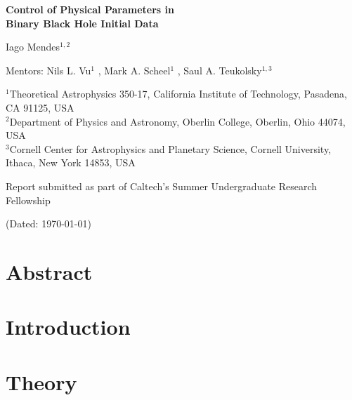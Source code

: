 \documentclass{../document}
\newcommand{\Caltech}{Theoretical Astrophysics 350-17, California Institute of Technology, Pasadena, CA 91125, USA}
\newcommand{\CaltechId}{1}
\newcommand{\Oberlin}{Department of Physics and Astronomy, Oberlin College, Oberlin, Ohio 44074, USA}
\newcommand{\OberlinId}{2}
\newcommand{\Cornell}{Cornell Center for Astrophysics and Planetary Science, Cornell University, Ithaca, New York 14853, USA}
\newcommand{\CornellId}{3}
\begin{document}
  \thispagestyle{plain}

  \vspace*{0.5cm}

  \begin{center}
    \Large\bf
    Control of Physical Parameters in \\
    Binary Black Hole Initial Data
  \end{center}
    
  \begin{center}
    Iago Mendes$^{\CaltechId,\OberlinId}$
  \end{center}

  \begin{flushleft}
    Mentors:
      Nils L. Vu$^\CaltechId$
        ,
      Mark A. Scheel$^\CaltechId$
        ,
      Saul A. Teukolsky$^{\CaltechId,\CornellId}$
  \end{flushleft}
   
  \begin{flushleft}
    \footnotesize
    $^\CaltechId$\Caltech \\
    $^\OberlinId$\Oberlin \\
    $^\CornellId$\Cornell
  \end{flushleft}

  \begin{flushleft}
    Report submitted as part of Caltech's Summer Undergraduate Research Fellowship
  \end{flushleft}

  \begin{center}
    (Dated: \today)
  \end{center}
  
  \vspace*{0.5cm}

  \section*{Abstract}

  \section{Introduction}

  \section{Theory}
\end{document}
